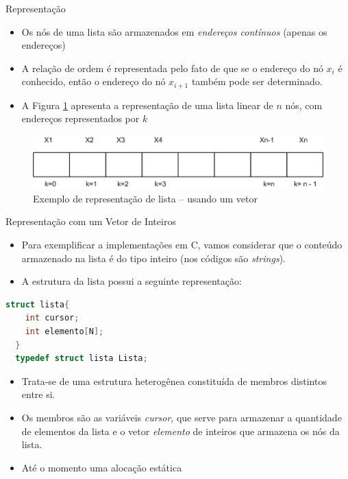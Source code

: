 \begin{frame}{Representação}
\begin{itemize}
	\item Os nós de uma lista são armazenados em {\it endereços contínuos} (apenas os endereços)
	\item A relação de ordem é representada pelo fato de que se o endereço do 
	nó $x_i$ é conhecido, então o endereço do nó $x_{i+1}$ também pode ser determinado. 	
	\item A Figura \ref{fig:lista-linear-repre} apresenta a representação de
	 uma lista linear de $n$ nós, com endereços representados por $k$
\end{itemize}

\begin{figure}[hb]
	\centering
		\includegraphics[width=.6\textwidth]{figs/fig_listas/lista-linear.png}			
			\caption{Exemplo de representação de lista -- usando um vetor}	
				\label{fig:lista-linear-repre}
			\end{figure} 
\end{frame}
\begin{frame}[fragile,c]{Representação com um Vetor de Inteiros}
\begin{itemize}
	\item Para exemplificar a implementações em C, vamos considerar que 
	o conteúdo armazenado na lista é do tipo inteiro (nos códigos são {\it strings}).
	\item A estrutura da lista possui a seguinte representação:	
\end{itemize}
\begin{lstlisting}[language=C]
  struct lista{
    int cursor;
    int elemento[N];
  }
  typedef struct lista Lista;
\end{lstlisting}

\begin{itemize}
	\item Trata-se de uma estrutura heterogênea constituída de membros distintos entre si. 
	\item Os membros são as variáveis \alert{\textit{cursor}}, que serve para armazenar a 
	quantidade de elementos da lista e o vetor \alert{\textit{elemento}} de inteiros
	que armazena os nós da lista.
	\item Até o momento uma alocação estática
\end{itemize}
\end{frame}

